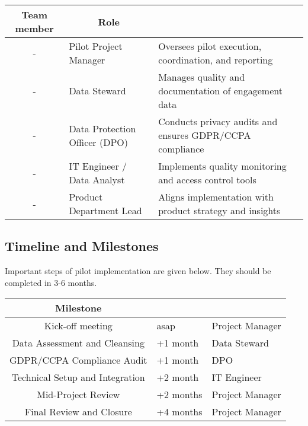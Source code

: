 \documentclass[11pt,a4paper,computermodern]{article}
\begin{document}
\begin{table}[ht]
	\centering
	\begin{threeparttable}
		\label{table:roles}
		\begin{tabularx}{0.99\textwidth}{c l >{\arraybackslash}X}
			\toprule
			\multicolumn{1}{c}{\textbf{Team member}} & \multicolumn{1}{c}{\textbf{Role}} & \multicolumn{1}{c}{\textbf{Responsibilities}} \\
			\midrule
			- & Pilot Project Manager & Oversees pilot execution, coordination, and reporting \\
			- & Data Steward & Manages quality and documentation of engagement data \\
			- & Data Protection Officer (DPO) & Conducts privacy audits and ensures GDPR/CCPA compliance \\
			- & IT Engineer / Data Analyst & Implements quality monitoring and access control tools \\
			- & Product Department Lead & Aligns implementation with product strategy and insights \\
			\bottomrule
		\end{tabularx}
	\end{threeparttable}
\end{table}


\subsection*{Timeline and Milestones}

Important steps of pilot implementation are given below. They should be completed in 3-6 months.

\begin{table}[ht]
	\centering
	\begin{threeparttable}
		\label{table:milestones}
		\begin{tabularx}{0.99\textwidth}{c >{\arraybackslash}X >{\arraybackslash}X}
			\toprule
			\multicolumn{1}{c}{\textbf{Milestone}} & \multicolumn{1}{c}{\textbf{Target date}} & \multicolumn{1}{c}{\textbf{Responsible}} \\
			\midrule
			Kick-off meeting & asap & Project Manager \\
			Data Assessment and Cleansing & +1 month & Data Steward \\
			GDPR/CCPA Compliance Audit & +1 month & DPO \\
			Technical Setup and Integration & +2 month & IT Engineer \\
			Mid-Project Review & +2 months & Project Manager \\
			Final Review and Closure & +4 months & Project Manager \\
			\bottomrule
		\end{tabularx}
	\end{threeparttable}
\end{table}
\end{document}
